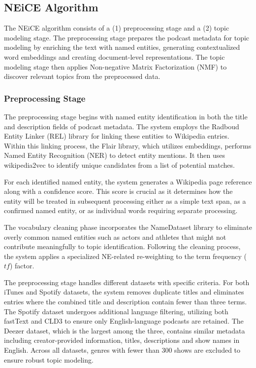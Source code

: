 \documentclass[manuscript]{acmart}
\begin{document}
\subsection{NEiCE Algorithm}

The NEiCE algorithm consists of a (1) preprocessing stage and a (2) topic modeling stage. The preprocessing stage prepares the podcast metadata for topic modeling by enriching the text with named entities, generating contextualized word embeddings and creating document-level representations. The topic modeling stage then applies Non-negative Matrix Factorization (NMF) to discover relevant topics from the preprocessed data.

\subsubsection{Preprocessing Stage}

The preprocessing stage begins with named entity identification in both the title and description fields of podcast metadata. The system employs the Radboud Entity Linker (REL) library for linking these entities to Wikipedia entries. Within this linking process, the Flair library, which utilizes embeddings, performs Named Entity Recognition (NER) to detect entity mentions. It then uses wikipedia2vec to identify unique candidates from a list of potential matches.

For each identified named entity, the system generates a Wikipedia page reference along with a confidence score. This score is crucial as it determines how the entity will be treated in subsequent processing \textendash{} either as a simple text span, as a confirmed named entity, or as individual words requiring separate processing.

The vocabulary cleaning phase incorporates the NameDataset library to eliminate overly common named entities such as actors and athletes that might not contribute meaningfully to topic identification. Following the cleaning process, the system applies a specialized NE-related re-weighting to the term frequency ($tf$) factor.

The preprocessing stage handles different datasets with specific criteria. For both iTunes and Spotify datasets, the system removes duplicate titles and eliminates entries where the combined title and description contain fewer than three terms. The Spotify dataset undergoes additional language filtering, utilizing both fastText and CLD3 to ensure only English-language podcasts are retained. The Deezer dataset, which is the largest among the three, contains similar metadata including creator-provided information, titles, descriptions and show names in English. Across all datasets, genres with fewer than 300 shows are excluded to ensure robust topic modeling.
\end{document}
